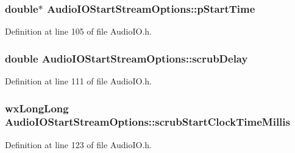 \subsubsection[{\texorpdfstring{p\+Start\+Time}{pStartTime}}]{\setlength{\rightskip}{0pt plus 5cm}double$\ast$ Audio\+I\+O\+Start\+Stream\+Options\+::p\+Start\+Time}\hypertarget{struct_audio_i_o_start_stream_options_a43d753f67299d5aa91402cf2a297536a}{}\label{struct_audio_i_o_start_stream_options_a43d753f67299d5aa91402cf2a297536a}


Definition at line 105 of file Audio\+I\+O.\+h.

\subsubsection[{\texorpdfstring{scrub\+Delay}{scrubDelay}}]{\setlength{\rightskip}{0pt plus 5cm}double Audio\+I\+O\+Start\+Stream\+Options\+::scrub\+Delay}\hypertarget{struct_audio_i_o_start_stream_options_aaea9d52a5df057012e6e9570670022be}{}\label{struct_audio_i_o_start_stream_options_aaea9d52a5df057012e6e9570670022be}


Definition at line 111 of file Audio\+I\+O.\+h.

\subsubsection[{\texorpdfstring{scrub\+Start\+Clock\+Time\+Millis}{scrubStartClockTimeMillis}}]{\setlength{\rightskip}{0pt plus 5cm}wx\+Long\+Long Audio\+I\+O\+Start\+Stream\+Options\+::scrub\+Start\+Clock\+Time\+Millis}\hypertarget{struct_audio_i_o_start_stream_options_a5df47acf7a90a322709000e4a2fc737a}{}\label{struct_audio_i_o_start_stream_options_a5df47acf7a90a322709000e4a2fc737a}


Definition at line 123 of file Audio\+I\+O.\+h.

